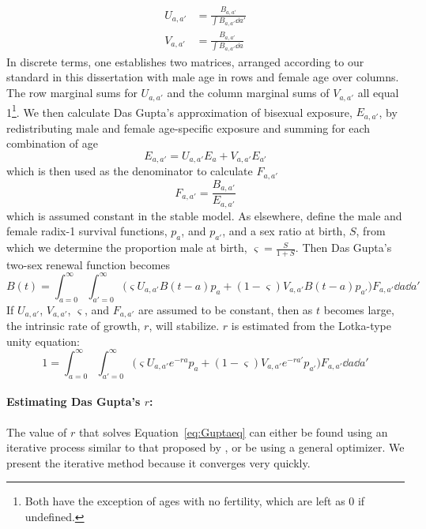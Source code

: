 \begin{align}
U_{a,a'} &= \frac{B_{a,a'}}{\int B_{a,a'} \dd a'}\\
V_{a,a'} &= \frac{B_{a,a'}}{\int B_{a,a'} \dd a}
\end{align}
In discrete terms, one establishes two matrices, arranged according to our
standard in this dissertation with male age in rows and female age over columns.
The row marginal sums for $U_{a,a'}$ and the column marginal sums of
$V_{a,a'}$ all equal 1\footnote{Both have the exception of ages with no
fertility, which are left as 0 if undefined.}. We then calculate Das Gupta's
approximation of bisexual exposure, $E_{a,a'}$, by redistributing male and
female age-specific exposure and summing for each combination of age
\begin{equation}
E_{a,a'} = U_{a,a'}E_a + V_{a,a'}E_{a'}
\end{equation}
which is then used as the denominator to calculate $F_{a,a'}$
\begin{equation}
F_{a,a'} = \frac{B_{a,a'}}{E_{a,a'}}
\end{equation}
which is assumed constant in the stable model. As elsewhere, define the
male and female radix-1 survival functions, $p_a$, and $p_{a'}$, and a sex ratio
at birth, $S$, from which we determine the proportion male at
birth, $\varsigma=\frac{S}{1+S}$. Then Das Gupta's two-sex renewal
function becomes
\begin{equation}
B(t) = \int_{a=0}^\infty \int_{a'=0}^\infty \Big( \varsigma U_{a,a'} B(t-a) p_a
+ (1-\varsigma)V_{a,a'}B(t-a) p_{a'}\Big)F_{a,a'} \dd a \dd a'
\end{equation}
If $U_{a,a'}$, $V_{a,a'}$, $\varsigma$, and $F_{a,a'}$ are assumed to
be constant, then as $t$ becomes large, the intrinsic rate of growth, $r$,
will stabilize. $r$ is estimated from the Lotka-type unity equation:
\begin{equation}
\label{eq:Guptaeq}
1 = \int_{a=0}^\infty \int_{a'=0}^\infty \Big( \varsigma U_{a,a'} e^{-ra} p_a
+ (1-\varsigma)V_{a,a'}e^{-ra'} p_{a'}\Big)F_{a,a'} \dd a \dd a'
\end{equation}
\paragraph{Estimating Das Gupta's $r$: } The value of $r$ that solves
Equation~\eqref{eq:Guptaeq} can either be found using an iterative 
process similar to that proposed by \citet{coale1957new}, or be using a general
optimizer. We present the iterative method because it converges very quickly.

